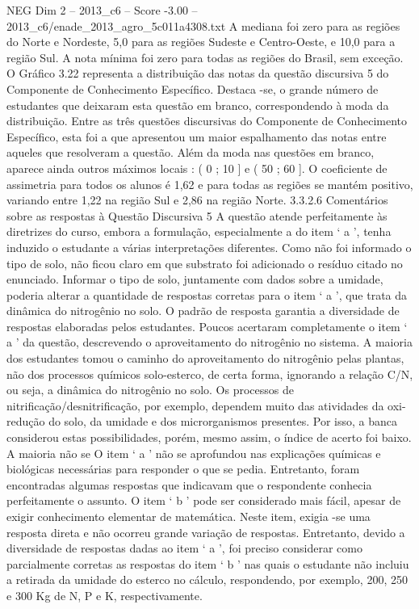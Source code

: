 \begin{textsample}{NEG Dim 2 – 2013\_c6 – Score -3.00 – 2013\_c6/enade\_2013\_agro\_5c011a4308.txt}
A mediana foi zero para as regiões do Norte e Nordeste, 5,0 para as regiões Sudeste e Centro-Oeste, e 10,0 para a região Sul.
A nota mínima foi zero para todas as regiões do Brasil, sem exceção.
O Gráfico 3.22 representa a distribuição das notas da questão discursiva 5 do Componente de Conhecimento Específico.
Destaca -se, o grande número de estudantes que deixaram esta questão em branco, correspondendo à moda da distribuição.
Entre as três questões discursivas do Componente de Conhecimento Específico, esta foi a que apresentou um maior espalhamento das notas entre aqueles que resolveram a questão.
Além da moda nas questões em branco, aparece ainda outros máximos locais : ( 0 ; 10 ] e ( 50 ; 60 ].
O coeficiente de assimetria para todos os alunos é 1,62 e para todas as regiões se mantém positivo, variando entre 1,22 na região Sul e 2,86 na região Norte. 3.3.2.6 Comentários sobre as respostas à Questão Discursiva 5 A questão atende perfeitamente às diretrizes do curso, embora a formulação, especialmente a do item ‘ a ’, tenha induzido o estudante a várias interpretações diferentes.
Como não foi informado o tipo de solo, não ficou claro em que substrato foi adicionado o resíduo citado no enunciado.
Informar o tipo de solo, juntamente com dados sobre a umidade, poderia alterar a quantidade de respostas corretas para o item ‘ a ’, que trata da dinâmica do nitrogênio no solo.
O padrão de resposta garantia a diversidade de respostas elaboradas pelos estudantes.
Poucos acertaram completamente o item ‘ a ’ da questão, descrevendo o aproveitamento do nitrogênio no sistema.
A maioria dos estudantes tomou o caminho do aproveitamento do nitrogênio pelas plantas, não dos processos químicos solo-esterco, de certa forma, ignorando a relação C/N, ou seja, a dinâmica do nitrogênio no solo.
Os processos de nitrificação/desnitrificação, por exemplo, dependem muito das atividades da oxi-redução do solo, da umidade e dos microrganismos presentes.
Por isso, a banca considerou estas possibilidades, porém, mesmo assim, o índice de acerto foi baixo.
A maioria não se O item ‘ a ’ não se aprofundou nas explicações químicas e biológicas necessárias para responder o que se pedia.
Entretanto, foram encontradas algumas respostas que indicavam que o respondente conhecia perfeitamente o assunto.
O item ‘ b ’ pode ser considerado mais fácil, apesar de exigir conhecimento elementar de matemática.
Neste item, exigia -se uma resposta direta e não ocorreu grande variação de respostas.
Entretanto, devido a diversidade de respostas dadas ao item ‘ a ’, foi preciso considerar como parcialmente corretas as respostas do item ‘ b ’ nas quais o estudante não incluiu a retirada da umidade do esterco no cálculo, respondendo, por exemplo, 200, 250 e 300 Kg de N, P e K, respectivamente.

\end{textsample}
